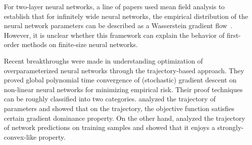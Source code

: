 For two-layer neural networks, a line of papers used mean field analysis to establish that for infinitely wide neural networks, the empirical distribution of the neural network parameters can be described as a Wasserstein gradient flow~\citep{mei2018mean,chizat2018global,sirignano2018mean,rotskoff2018neural,wei2018margin}.
However, it is unclear whether this framework can explain the behavior of first-order methods on finite-size neural networks. %

Recent breakthroughs were made in understanding optimization of overparameterized neural networks through the trajectory-based approach.
They proved global polynomial time convergence of (stochastic) gradient descent on non-linear neural networks for minimizing empirical risk.
Their proof techniques can be roughly classified into two categories.
\citet{li2018learning,allen2018convergence,zou2018stochastic} analyzed the trajectory of parameters and showed that on the trajectory, the objective function satisfies certain gradient dominance property.
On the other hand, \cite{du2018global,du2018provably} analyzed the trajectory of network predictions on training samples and showed that it enjoys a strongly-convex-like property.



